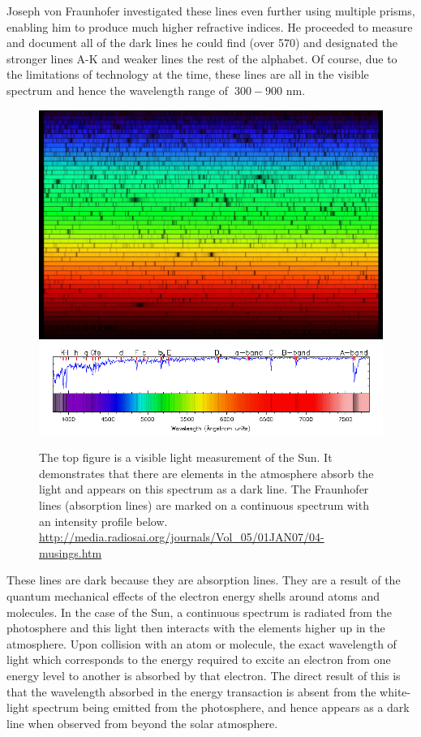 Joseph von Fraunhofer investigated these lines even further using multiple prisms, enabling him to produce much higher refractive indices. 
He proceeded to measure and document all of the dark lines he could find (over 570) and designated the stronger lines A-K and weaker lines the rest of the alphabet.
Of course, due to the limitations of technology at the time, these lines are all in the visible spectrum and hence the wavelength range of $~300 - 900$ nm.

\begin{figure}
	\centering
	\includegraphics[width=\linewidth]{Chapter1/Figs/sun_spectrum}
	\includegraphics[width=\linewidth]{Chapter1/Figs/fraunhofer_lines}
	\label{fig:fraunhofer}
	\caption{The top figure is a visible light measurement of the Sun. It demonstrates that there are elements in the atmosphere absorb the light and appears on this spectrum as a dark line. The Fraunhofer lines (absorption lines) are marked on a continuous spectrum with an intensity profile below.
		\url{http://media.radiosai.org/journals/Vol_05/01JAN07/04-musings.htm}}
\end{figure}


These lines are dark because they are absorption lines.
They are a result of the quantum mechanical effects of the electron energy shells around atoms and molecules.
In the case of the Sun, a continuous spectrum is radiated from the photosphere and this light then interacts with the elements higher up in the atmosphere.
Upon collision with an atom or molecule, the exact wavelength of light which corresponds to the energy required to excite an electron from one energy level to another is absorbed by that electron.
The direct result of this is that the wavelength absorbed in the energy transaction is absent from the white-light spectrum being emitted from the photosphere, and hence appears as a dark line when observed from beyond the solar atmosphere. 

